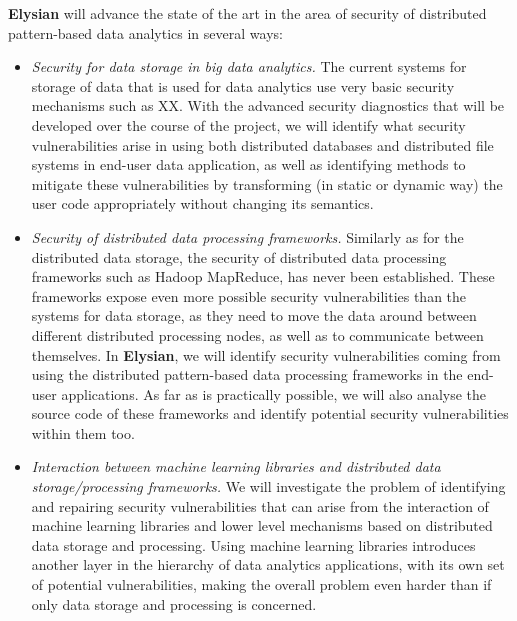 \documentclass[a4paper,11pt]{article}
\newcommand{\project}[1]{\textbf{#1}\xspace}
\newcommand{\SECURITY}{\project{Elysian}}
\newcommand{\TheProject}{\SECURITY}
\begin{document}
\begin{mdframed}[backgroundcolor=gray!10]
\TheProject{} will advance the state of the art in the area of security of distributed pattern-based data analytics in several ways:
\begin{itemize}
\item \emph{Security for data storage in big data analytics.} The current systems for storage of data that is used for data analytics use very basic security mechanisms such as XX. With the advanced security diagnostics that will be developed over the course of the project, we will identify what security vulnerabilities arise in using both distributed databases and distributed file systems in end-user data application, as well as identifying methods to mitigate these vulnerabilities by transforming (in static or dynamic way) the user code appropriately without changing its semantics. 
\item \emph{Security of distributed data processing frameworks.} Similarly as for the distributed data storage, the security of distributed data processing frameworks such as Hadoop MapReduce, has never been established. These frameworks expose even more possible security vulnerabilities than the systems for data storage, as they need to move the data around between different distributed processing nodes, as well as to communicate between themselves. In \TheProject{}, we will identify security vulnerabilities coming from using the distributed pattern-based data processing frameworks in the end-user applications. As far as is practically possible, we will also analyse the source code of these frameworks and identify potential security vulnerabilities within them too.
\item \emph{Interaction between machine learning libraries and distributed data storage/processing frameworks.} We will investigate the problem of identifying and repairing security vulnerabilities that can arise from the interaction of machine learning libraries and lower level mechanisms based on distributed data storage and processing. Using machine learning libraries introduces another layer in the hierarchy of data analytics applications, with its own set of potential vulnerabilities, making the overall problem even harder than if only data storage and processing is concerned. 
\end{itemize}
\end{mdframed}
\end{document}
